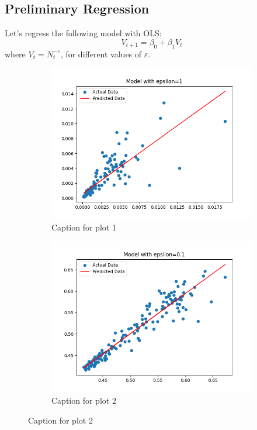     \subsection{Preliminary Regression}
    Let's regress the following model with OLS:
    \begin{equation}
        V_{t+1} = \beta_0 + \beta_1 V_t
    \end{equation}
    where $V_t=N_t^{-\varepsilon}$, for different values of $\varepsilon$.
    
    \begin{figure}[h!]
        \centering
        \begin{subfigure}[b]{0.3\textwidth}
            \includegraphics[width=.8\linewidth]{plots/epsilon_1}
            \caption{Caption for plot 1}
        \end{subfigure} \quad
        \begin{subfigure}[b]{0.3\textwidth}
            \includegraphics[width=.8\linewidth]{plots/epsilon_0.1}
            \caption{Caption for plot 2}
        \end{subfigure} \quad

\end{figure}
